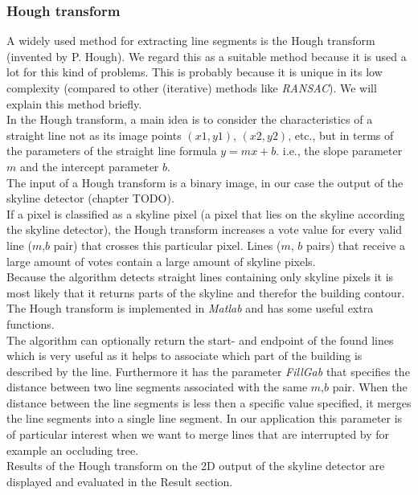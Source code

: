 \documentclass[10pt]{article}
\begin{document}
\subsubsection{Hough transform}
	A widely used method for extracting line segments is the Hough transform
	(invented by P. Hough).  We regard this as a suitable method because it is
	used a lot for this kind of problems. This is probably because it is unique
	in its low complexity (compared to other (iterative) methods like
	\emph{RANSAC}).
	We will explain this method briefly.\\
	In the Hough transform, a main idea is to consider the characteristics of a
	straight line not as its image points $(x1, y1)$, $(x2, y2)$, etc., but in
	terms of the parameters of the straight line formula $y = mx + b$. i.e., the
	slope parameter $m$ and the intercept parameter $b$.\\
	The input of a Hough transform is a binary image, in our case the output of 
	the skyline detector (chapter TODO).\\
	If a pixel is classified as a skyline pixel (a pixel that lies on the
	skyline according the skyline detector), the Hough transform increases
	a vote value for every valid line ($m$,$b$ pair) that crosses this
	particular pixel.  Lines ($m$, $b$ pairs) that receive a large amount of votes
	contain a large amount of skyline pixels.\\
	Because the algorithm detects straight lines containing only skyline pixels it is
	most likely that it returns parts of the skyline and therefor the building contour. \\
	The Hough transform is implemented in \emph{Matlab} and has some useful extra functions.\\
	The algorithm can optionally return the start- and endpoint of the found lines 
	which is very useful as it helps to associate which part of the building is described by the line.
	Furthermore it has the parameter \emph{FillGab} that specifies the distance
	between two line segments associated with the same $m$,$b$ pair. When the
	distance between the line segments is less then a specific value specified, it merges
	the line segments into a single line segment. In our application this
	parameter is of particular interest when we want to merge lines that are
	interrupted by for example an occluding tree.\\
	Results of the Hough transform on the 2D output of the skyline detector are
	displayed and evaluated in the Result section.
\end{document}
